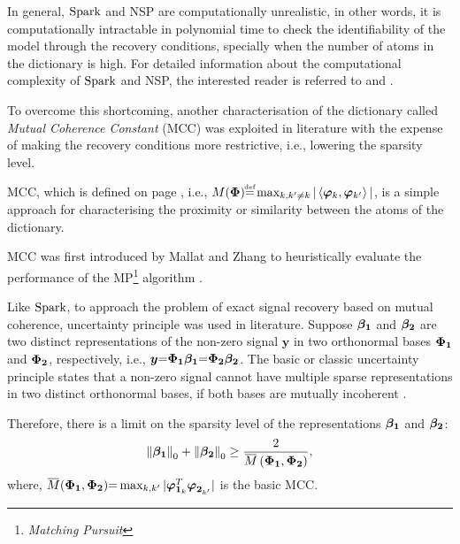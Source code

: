 In general, 
$\mathrm{Spark}$ and 
NSP are computationally unrealistic, in other words, it is computationally intractable in polynomial time to check the identifiability of the model through the recovery conditions, specially when the number of atoms in the dictionary is high. 
For detailed information about the computational complexity of $\mathrm{Spark}$ and NSP, the interested reader is referred to \cite{Tillmann2013} and \cite{Tillmann2014}.

To overcome this shortcoming, another characterisation of the dictionary called \emph{Mutual Coherence Constant} (MCC) was exploited in literature with the expense of making the recovery conditions more restrictive, i.e., lowering the sparsity level.

MCC, which is defined on page \pageref{eq:MIC}, i.e., $M(\myPhi) {\myeq} \max_{k,k' \neq k} |\left\langle \boldsymbol{\varphi}_k , \boldsymbol{\varphi}_{k'} \right\rangle|$, is a simple approach for characterising the proximity or similarity between the atoms of the dictionary.

MCC was first introduced by Mallat and Zhang to heuristically evaluate the performance of the MP\footnote{\emph{Matching Pursuit}} algorithm \cite{Mallat1993}. 

Like $\mathrm{Spark}$, to approach the problem of exact signal recovery based on mutual coherence, uncertainty principle was used in literature.
Suppose $\boldsymbol{\beta_1}$ and $\boldsymbol{\beta_2}$ are two distinct representations of the non-zero signal $\boldsymbol{y}$ in two orthonormal bases $\boldsymbol{\Phi}_{\boldsymbol{1}}$ and $\boldsymbol{\Phi}_{\boldsymbol{2}}$, respectively, i.e., $\boldsymbol{y} {=} \boldsymbol{\Phi}_{\boldsymbol{1}} \boldsymbol{\beta_1} {=} \boldsymbol{\Phi}_{\boldsymbol{2}} \boldsymbol{\beta_2}$.
The basic or classic uncertainty principle states that a non-zero signal cannot have multiple sparse representations in two distinct orthonormal bases, if both bases are mutually incoherent \cite{Donoho1989,Donoho2001,Elad2001,Elad2002a}. 

Therefore, there is a limit on the sparsity level of the representations $\boldsymbol{\beta_1}$ and $\boldsymbol{\beta_2}$:
\begin{equation}
\label{eq:UP-basic} 
\mynorm{\mybetao}_0 + \mynorm{\mybetaTwo}_0 
\geq\frac{2}{\overbar{M} \myparanthese{\myPhiOne,\myPhiTwo}},
\end{equation}
where, $\overbar{M} (\myPhiOne,\myPhiTwo) \seq \max_{k,k'} |\boldsymbol{\varphi}_{{\boldsymbol{1}}_k}^T \boldsymbol{\varphi}_{{\boldsymbol{2}}_{k'}}^{ }|$ is the basic MCC.

